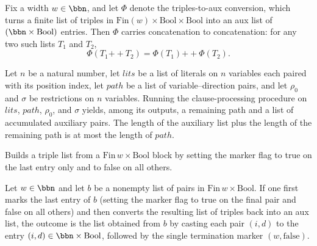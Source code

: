 \begin{lemma}
\label{SwitchingLemma.triplesToAux_append}
\leanok
{}
Fix a width $w \in \bbn$, and let $\Phi$ denote the triples-to-aux conversion, which
turns a finite list of triples in $\mathrm{Fin}(w) \times \mathrm{Bool} \times
\mathrm{Bool}$ into an aux list of $(\bbn \times \mathrm{Bool})$ entries. Then $\Phi$
carries concatenation to concatenation: for any two such lists $T_1$ and $T_2$, \[
\Phi(T_1 \mathbin{+\!\!+} T_2) = \Phi(T_1) \mathbin{+\!\!+} \Phi(T_2). \]
\end{lemma}

\begin{lemma}
\label{SwitchingLemma.processClauseLits_len_add}
\leanok
{}
Let $n$ be a natural number, let $\mathit{lits}$ be a list of literals on $n$ variables
each paired with its position index, let $\mathit{path}$ be a list of variable–direction
pairs, and let $\rho_0$ and $\sigma$ be restrictions on $n$ variables. Running the
clause-processing procedure on $\mathit{lits}$, $\mathit{path}$, $\rho_0$, and $\sigma$
yields, among its outputs, a remaining path and a list of accumulated auxiliary pairs.
The length of the auxiliary list plus the length of the remaining path is at most the
length of $\mathit{path}$.
\end{lemma}

\begin{definition}
\label{SwitchingLemma.markLast}
\leanok
Builds a triple list from a $\mathrm{Fin}\,w \times \mathrm{Bool}$ block by
setting the marker flag to true on the last entry only and to false on all
others.
\end{definition}

\begin{lemma}
\label{SwitchingLemma.triplesToAux_markLast}
\leanok
{}
Let $w \in \bbn$ and let $b$ be a nonempty list of pairs in $\mathrm{Fin}\,w \times
\mathrm{Bool}$. If one first marks the last entry of $b$ (setting the marker flag to
true on the final pair and false on all others) and then converts the resulting list of
triples back into an aux list, the outcome is the list obtained from $b$ by casting each
pair $(i, d)$ to the entry $(i, d) \in \bbn \times \mathrm{Bool}$, followed by the
single termination marker $(w, \mathrm{false})$.
\end{lemma}

